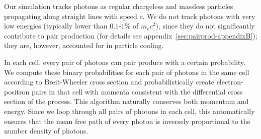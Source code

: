 Our simulation tracks photons as regular chargeless and massless particles propagating along straight lines with speed $c$. We do not track photons with very low energies (typically lower than $0.1\text{-}1\%$ of $m_e c^2$), since they do not significantly contribute to pair production (for details see appendix~\ref{sec:pairprod-appendixB}); they are, however, accounted for in particle cooling.

In each cell, every pair of photons can pair produce with a certain probability. We compute these binary probabilities for each pair of photons in the same cell according to Breit-Wheeler cross section and probabilistically create electron-positron pairs in that cell with momenta consistent with the differential cross section of the process. This algorithm naturally conserves both momentum and energy. Since we loop through all pairs of photons in each cell, this automatically ensures that the mean free path of every photon is inversely proportional to the number density of photons.

